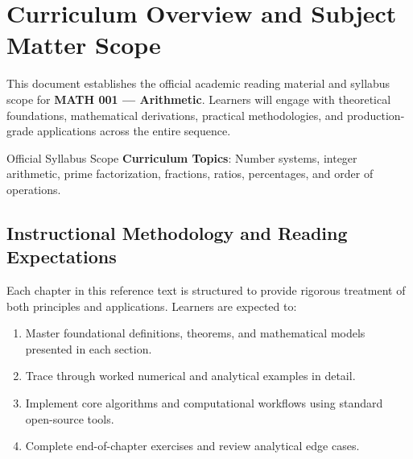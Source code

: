 \section{Curriculum Overview and Subject Matter Scope}

This document establishes the official academic reading material and syllabus scope for \textbf{MATH 001 --- Arithmetic}. Learners will engage with theoretical foundations, mathematical derivations, practical methodologies, and production-grade applications across the entire sequence.

\begin{InsightBox}{Official Syllabus Scope}
  \textbf{Curriculum Topics}: Number systems, integer arithmetic, prime factorization, fractions, ratios, percentages, and order of operations.
\end{InsightBox}

\subsection{Instructional Methodology and Reading Expectations}

Each chapter in this reference text is structured to provide rigorous treatment of both principles and applications. Learners are expected to:
\begin{enumerate}
  \item Master foundational definitions, theorems, and mathematical models presented in each section.
  \item Trace through worked numerical and analytical examples in detail.
  \item Implement core algorithms and computational workflows using standard open-source tools.
  \item Complete end-of-chapter exercises and review analytical edge cases.
\end{enumerate}

